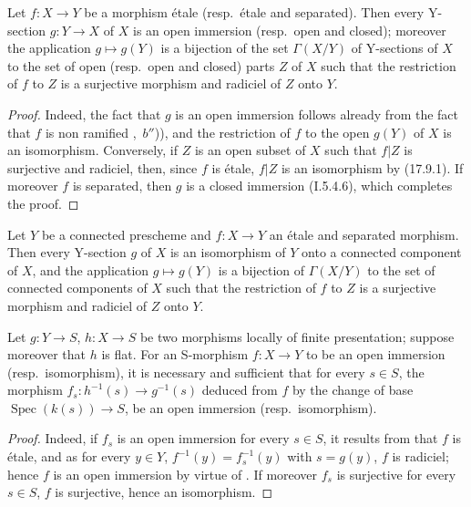 \begin{corollary}[17.9.3]
\label{IV.17.9.3}
Let $f:X\to Y$ be a morphism \'etale (resp.\ \'etale and separated).
Then every Y-section $g:Y\to X$ of $X$ is an open immersion (resp.\ open and closed); moreover the application $g\mapsto g(Y)$ is a bijection of the set $\Gamma(X/Y)$ of Y-sections of $X$ to the set of open (resp.\ open and closed) parts $Z$ of $X$ such that the restriction of $f$ to $Z$ is a surjective morphism and radiciel of $Z$ onto $Y$.
\end{corollary}

\begin{proof}
Indeed, the fact that $g$ is an open immersion follows already from the fact that $f$ is non ramified ,~$b''$)), and the restriction of $f$ to the open $g(Y)$ of $X$ is an isomorphism.
Conversely, if $Z$ is an open subset of $X$ such that $f|Z$ is surjective and radiciel, then, since $f$ is \'etale, $f|Z$ is an isomorphism by (17.9.1).
If moreover $f$ is separated, then $g$ is a closed immersion (I.5.4.6), which completes the proof.
\end{proof}

\begin{corollary}[17.9.4]
\label{IV.17.9.4}
Let $Y$ be a connected prescheme and $f:X\to Y$ an \'etale and separated morphism.
Then every Y-section $g$ of $X$ is an isomorphism of $Y$ onto a connected component of $X$, and the application $g\mapsto g(Y)$ is a bijection of $\Gamma(X/Y)$ to the set of connected components of $X$ such that the restriction of $f$ to $Z$ is a surjective morphism and radiciel of $Z$ onto $Y$.
\end{corollary}

\begin{corollary}[17.9.5]
\label{IV.17.9.5}
Let $g:Y\to S$, $h:X\to S$ be two morphisms locally of finite presentation; suppose moreover that $h$ is flat.
For an S-morphism $f:X\to Y$ to be an open immersion (resp.\ isomorphism), it is necessary and sufficient that for every $s\in S$, the morphism $f_s:h^{-1}(s)\to g^{-1}(s)$ deduced from $f$ by the change of base $\operatorname{Spec}(k(s))\to S$, be an open immersion (resp.\ isomorphism).
\end{corollary}

\begin{proof}
Indeed, if $f_s$ is an open immersion for every $s\in S$, it results from  that $f$ is \'etale, and as for every $y\in Y$, $f^{-1}(y)=f_s^{-1}(y)$ with $s=g(y)$, $f$ is radiciel; hence $f$ is an open immersion by virtue of .
If moreover $f_s$ is surjective for every $s\in S$, $f$ is surjective, hence an isomorphism.
\end{proof}

